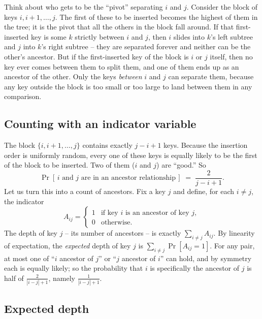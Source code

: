 \begin{intuitionbox}
Think about who gets to be the ``pivot'' separating $i$ and $j$. Consider the block of keys
$i, i{+}1, \dots, j$. The first of these to be inserted becomes the highest of them in the
tree; it is the pivot that all the others in the block fall around. If that first-inserted key
is some $k$ strictly between $i$ and $j$, then $i$ slides into $k$'s left subtree and $j$ into
$k$'s right subtree -- they are separated forever and neither can be the other's ancestor. But
if the first-inserted key of the block is $i$ or $j$ itself, then no key ever comes between
them to split them, and one of them ends up as an ancestor of the other. Only the keys
\emph{between} $i$ and $j$ can separate them, because any key outside the block is too small
or too large to land between them in any comparison.
\end{intuitionbox}

\subsection{Counting with an indicator variable}

The block $\{i, i+1, \dots, j\}$ contains exactly $j - i + 1$ keys. Because the insertion order
is uniformly random, every one of these keys is equally likely to be the first of the block to
be inserted. Two of them ($i$ and $j$) are ``good.'' So
\[
\Pr[\,i \text{ and } j \text{ are in an ancestor relationship}\,]
   \;=\; \frac{2}{j - i + 1}.
\]
Let us turn this into a count of ancestors. Fix a key $j$ and define, for each $i \ne j$, the
indicator
\[
A_{ij} = \begin{cases} 1 & \text{if key } i \text{ is an ancestor of key } j,\\ 0 & \text{otherwise.}\end{cases}
\]
The depth of key $j$ -- its number of ancestors -- is exactly $\sum_{i \ne j} A_{ij}$. By
linearity of expectation, the \emph{expected} depth of key $j$ is $\sum_{i \ne j}
\Pr[A_{ij}=1]$. For any pair, at most one of ``$i$ ancestor of $j$'' or ``$j$ ancestor of
$i$'' can hold, and by symmetry each is equally likely; so the probability that $i$ is
specifically the ancestor of $j$ is half of $\tfrac{2}{|i-j|+1}$, namely $\tfrac{1}{|i-j|+1}$.

\subsection{Expected depth}

